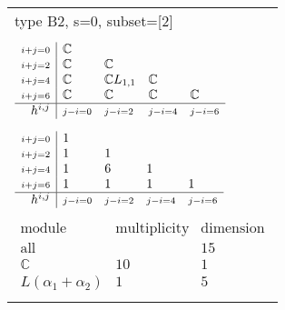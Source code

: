 \documentclass[crop,border=2mm]{standalone}
\begin{document}
\begin{tabular}{l}
{\huge type B2, s=0, subset=[2]}\\ \\


$\displaystyle
\begin{array}{r|l l l l}
	{\scriptstyle i+j=0}&\mathbb{C}&&&\\
	{\scriptstyle i+j=2}&\mathbb{C}&\mathbb{C}&&\\
	{\scriptstyle i+j=4}&\mathbb{C}&\mathbb{C}L_{1,1}&\mathbb{C}&\\
	{\scriptstyle i+j=6}&\mathbb{C}&\mathbb{C}&\mathbb{C}&\mathbb{C}\\
	\hline h^{i,j}&{\scriptstyle j-i=0}&{\scriptstyle j-i=2}&{\scriptstyle j-i=4}&{\scriptstyle j-i=6}
\end{array}
$ \\ \\


$\displaystyle
\begin{array}{r|l l l l}
	{\scriptstyle i+j=0}&1&&&\\
	{\scriptstyle i+j=2}&1&1&&\\
	{\scriptstyle i+j=4}&1&6&1&\\
	{\scriptstyle i+j=6}&1&1&1&1\\
	\hline h^{i,j}&{\scriptstyle j-i=0}&{\scriptstyle j-i=2}&{\scriptstyle j-i=4}&{\scriptstyle j-i=6}
\end{array}
$ \\ \\


$\displaystyle
\begin{array}{rll}
	\text{module}&\text{multiplicity}&\text{dimension} \\ \hline \text{all}&&15 \\
	\mathbb{C}&10&1\\
	L\left(\alpha_{1}+\alpha_{2}\right)&1&5
\end{array}
$ \\ \\

\end{tabular}
\end{document}
